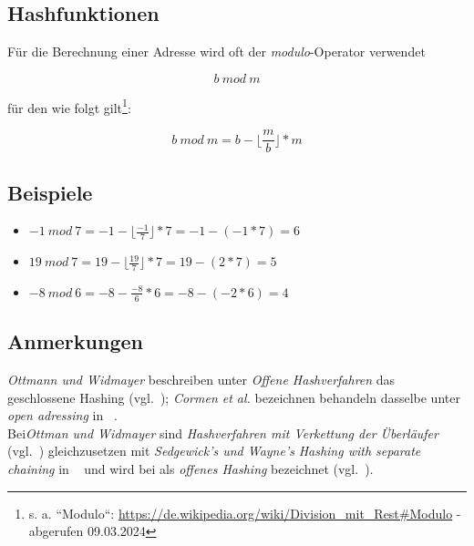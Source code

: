 \subsection{Hashfunktionen}

Für die Berechnung einer Adresse wird oft der \textit{modulo}-Operator verwendet

\begin{equation}
    b\ mod\ m
\end{equation}

\noindent
für den wie folgt gilt\footnote{
s. a. ``Modulo``: \url{https://de.wikipedia.org/wiki/Division_mit_Rest#Modulo} - abgerufen 09.03.2024
}:

\begin{equation}
    b\ mod\ m = b - \lfloor \frac{m}{b} \rfloor * m
\end{equation}

\subsection*{Beispiele}

\begin{itemize}
    \item $-1\ mod\ 7 = -1 - \lfloor \frac{-1}{7} \rfloor * 7 =  -1 - (-1 * 7) = 6$
    \item $19\ mod\ 7 = 19 - \lfloor \frac{19}{7} \rfloor * 7 =  19 - (2 * 7) = 5$
    \item $-8\ mod\ 6 = -8 - \frac{-8}{6} * 6 = -8 - (-2 * 6) = 4$
\end{itemize}




\subsection{Anmerkungen}
\textit{Ottmann und Widmayer} beschreiben unter \textit{Offene Hashverfahren} das geschlossene Hashing (vgl.~\cite[203 ff.]{OW17d}); \textit{Cormen et al.} bezeichnen behandeln dasselbe unter \textit{open adressing} in ~\cite[293 ff.]{CL22}.\\

\noindent
Bei\textit{Ottman und Widmayer} sind \textit{Hashverfahren mit Verkettung der Überläufer} (vgl.~\cite[198 ff.]{OW17d}) gleichzusetzen mit \textit{Sedgewick's und Wayne's} \textit{Hashing with separate  chaining} in ~\cite[464 ff.]{SW11} und wird bei  als \textit{offenes Hashing} bezeichnet (vgl.~\cite[116]{GD18d}).
